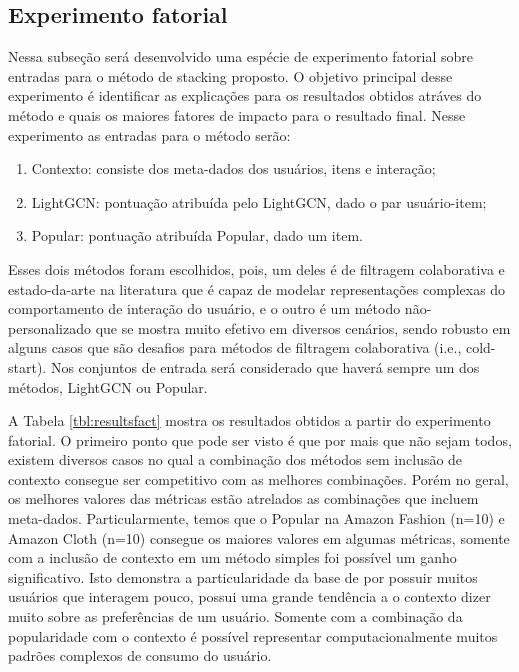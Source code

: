 \documentclass[sigconf]{acmart}
\begin{document}
\subsection{Experimento fatorial}

Nessa subseção será desenvolvido uma espécie de experimento fatorial sobre entradas para o método de stacking proposto. O objetivo principal desse experimento é identificar as explicações para os resultados obtidos atráves do método e quais os maiores fatores de impacto para o resultado final. Nesse experimento as entradas para o método serão:

\begin{enumerate}
  \item Contexto: consiste dos meta-dados dos usuários, itens e interação;
  \item LightGCN: pontuação atribuída pelo LightGCN, dado o par usuário-item;
  \item Popular: pontuação atribuída Popular, dado um item.
\end{enumerate}

Esses dois métodos foram escolhidos, pois, um deles é de filtragem colaborativa e estado-da-arte na literatura que é capaz de modelar representações complexas do comportamento de interação do usuário,  e o outro é um método não-personalizado que se mostra muito efetivo em diversos cenários, sendo robusto em alguns casos que são desafios para métodos de filtragem colaborativa (i.e., cold-start). Nos conjuntos de entrada será considerado que haverá sempre um dos métodos, LightGCN ou Popular.

A Tabela \ref{tbl:resultsfact} mostra os resultados obtidos a partir do experimento fatorial. O primeiro ponto que pode ser visto é que por mais que não sejam todos, existem diversos casos no qual a combinação dos métodos sem inclusão de contexto consegue ser competitivo com as melhores combinações. Porém no geral, os melhores valores das métricas estão atrelados as combinações que incluem meta-dados. Particularmente, temos que o Popular na Amazon Fashion (n=10) e Amazon Cloth (n=10) consegue os maiores valores em algumas métricas, somente com a inclusão de contexto em um método simples foi possível um ganho significativo. Isto demonstra a particularidade da base de por possuir muitos usuários que interagem pouco, possui uma grande tendência a o contexto dizer muito sobre as preferências de um usuário. Somente com a combinação da popularidade com o contexto é possível representar computacionalmente muitos padrões complexos de consumo do usuário.
\end{document}
